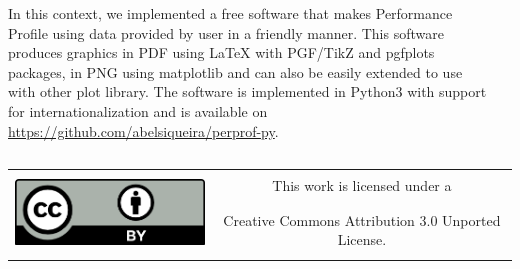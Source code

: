 \documentclass[]{beamer}
\begin{document}
\begin{frame}[t,fragile]
\begin{columns}[t]
\begin{column}{0.4\textwidth}
      In this context, we implemented a free software that makes Performance
      Profile using data provided by user in a friendly manner. This software
      produces graphics in PDF using LaTeX with PGF/TikZ\nocite{TikZ} and
      pgfplots\nocite{pgfplots} packages, in PNG using
      matplotlib\nocite{Hunter:2007} and can also be easily extended to use with
      other plot library. The software is implemented in Python3 with support
      for internationalization and is available on
      \url{https://github.com/abelsiqueira/perprof-py}.
    \end{column}
    \begin{column}{0.4\textwidth}
      \printbibliography
    \end{column}
  \end{columns}
  \vfill
  \begin{center}
    \begin{tabular}[]{cc}
      \multirow{2}{*}{\includegraphics[height=60pt]{figures/cc-by}} &
      \Large{This work is licensed under a}\\ &
      \Large{Creative Commons Attribution 3.0 Unported License.}
    \end{tabular}
  \end{center}
\end{frame}
\end{document}
